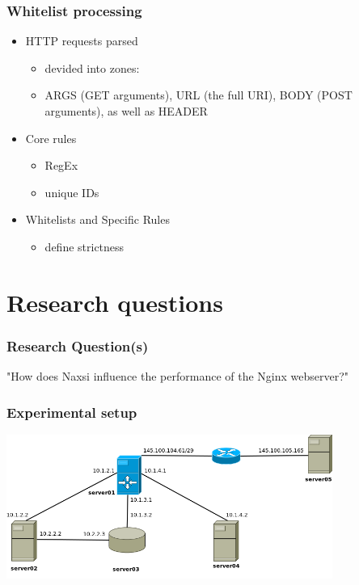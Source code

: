 \begin{frame}
  \frametitle{Whitelist processing}
    \begin{itemize}
     \item HTTP requests parsed
      \begin{itemize}
        \item devided into zones:
	\item ARGS (GET arguments), URL (the full URI), BODY (POST arguments), as well as HEADER
      \end{itemize}
      \item Core rules
      \begin{itemize}
        \item RegEx
	\item unique IDs
      \end{itemize}
     \item Whitelists and Specific Rules
       \begin{itemize}
        \item define strictness
      \end{itemize}
  \end{itemize}
\end{frame}

\section{Research questions}

\begin{frame}
  \frametitle{Research Question(s)}
   \begin{center}
   \LARGE{"How does Naxsi influence the performance of the Nginx webserver?"}
  \end{center}
\end{frame}


\begin{frame}
  \frametitle{Experimental setup}
    \begin{center} 
      \includegraphics[width=0.80\textwidth]{../paper/images/infrastructure.png}
    \end{center}
\end{frame}

